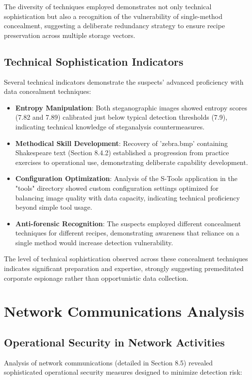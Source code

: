 The diversity of techniques employed demonstrates not only technical sophistication but also a recognition of the vulnerability of single-method concealment, suggesting a deliberate redundancy strategy to ensure recipe preservation across multiple storage vectors.

\subsection{Technical Sophistication Indicators}
Several technical indicators demonstrate the suspects' advanced proficiency with data concealment techniques:

\begin{itemize}
    \item \textbf{Entropy Manipulation}: Both steganographic images showed entropy scores (7.82 and 7.89) calibrated just below typical detection thresholds (7.9), indicating technical knowledge of steganalysis countermeasures.
    
    \item \textbf{Methodical Skill Development}: Recovery of 'zebra.bmp' containing Shakespeare text (Section 8.4.2) established a progression from practice exercises to operational use, demonstrating deliberate capability development.
    
    \item \textbf{Configuration Optimization}: Analysis of the S-Tools application in the "tools" directory showed custom configuration settings optimized for balancing image quality with data capacity, indicating technical proficiency beyond simple tool usage.
    
    \item \textbf{Anti-forensic Recognition}: The suspects employed different concealment techniques for different recipes, demonstrating awareness that reliance on a single method would increase detection vulnerability.
\end{itemize}

The level of technical sophistication observed across these concealment techniques indicates significant preparation and expertise, strongly suggesting premeditated corporate espionage rather than opportunistic data collection.

\section{Network Communications Analysis}
\subsection{Operational Security in Network Activities}
Analysis of network communications (detailed in Section 8.5) revealed sophisticated operational security measures designed to minimize detection risk:

